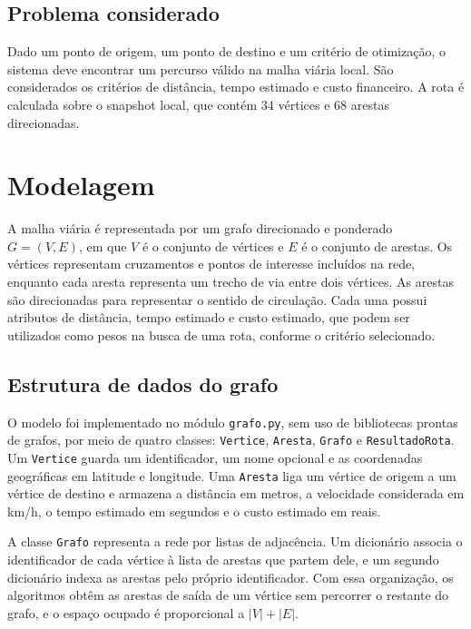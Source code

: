 \documentclass[12pt]{article}
\begin{document}
\subsection{Problema considerado}
Dado um ponto de origem, um ponto de destino e um critério de
otimização, o sistema deve encontrar um percurso válido na malha
viária local. São considerados os critérios de distância, tempo
estimado e custo financeiro. A rota é calculada sobre o snapshot local,
que contém 34 vértices e 68 arestas direcionadas.

\section{Modelagem}
\label{sec:modelagem}

A malha viária é representada por um grafo direcionado e ponderado
$G=(V,E)$, em que $V$ é o conjunto de vértices e $E$ é o conjunto de
arestas. Os vértices representam cruzamentos e pontos de interesse
incluídos na rede, enquanto cada aresta representa um trecho de via
entre dois vértices. As arestas são direcionadas para representar o
sentido de circulação. Cada uma possui atributos de distância, tempo
estimado e custo estimado, que podem ser utilizados como pesos na
busca de uma rota, conforme o critério selecionado.

\subsection{Estrutura de dados do grafo}
\label{subsec:estrutura-grafo}

O modelo foi implementado no módulo \texttt{grafo.py}, sem uso de
bibliotecas prontas de grafos, por meio de quatro classes:
\texttt{Vertice}, \texttt{Aresta}, \texttt{Grafo} e
\texttt{ResultadoRota}. Um \texttt{Vertice} guarda um identificador,
um nome opcional e as coordenadas geográficas em latitude e longitude.
Uma \texttt{Aresta} liga um vértice de origem a um vértice de destino e
armazena a distância em metros, a velocidade considerada em km/h, o
tempo estimado em segundos e o custo estimado em reais.

A classe \texttt{Grafo} representa a rede por listas de adjacência. Um
dicionário associa o identificador de cada vértice à lista de arestas
que partem dele, e um segundo dicionário indexa as arestas pelo próprio
identificador. Com essa organização, os algoritmos obtêm as arestas de
saída de um vértice sem percorrer o restante do grafo, e o espaço
ocupado é proporcional a $|V|+|E|$.
\end{document}
